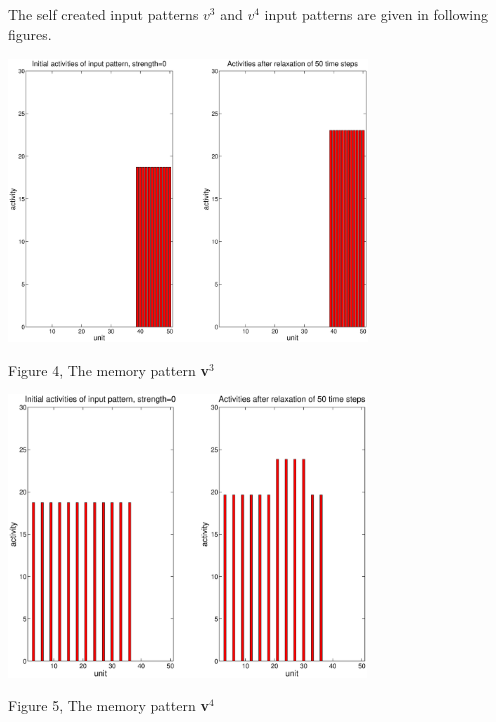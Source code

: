 \documentclass{article}
\begin{document}
\subsection{}
The self created input patterns $v^3$ and $v^4$ input patterns are given in following figures.

\begin{center}
\includegraphics[width=\textwidth, height=75mm]{memory_v3.eps}
\begin{footnotesize}
 Figure 4, The memory pattern \textbf{v}$^3$ 
\end{footnotesize}
\end{center}

\begin{center}
\includegraphics[width=\textwidth, height=75mm]{memory_v4.eps}
\begin{footnotesize}
 Figure 5, The memory pattern \textbf{v}$^4$ 
\end{footnotesize}
\end{center}
\end{document}
